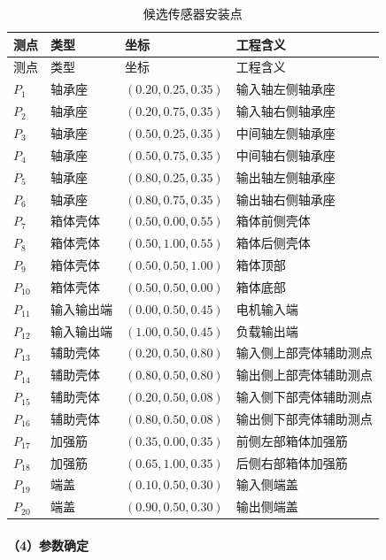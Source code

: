\documentclass[UTF8,a4paper,12pt]{ctexart}
\numberwithin{figure}{section}
\numberwithin{table}{section}
\begin{document}
\begin{longtable}{>{\centering\arraybackslash}p{1.3cm}p{2.6cm}>{\centering\arraybackslash}p{3.1cm}p{5.6cm}}
\caption{候选传感器安装点}\\
\toprule
测点 & 类型 & 坐标 & 工程含义\\
\midrule
\endfirsthead
\toprule
测点 & 类型 & 坐标 & 工程含义\\
\midrule
\endhead
\bottomrule
\endfoot
\(P_1\) & 轴承座 & \((0.20,0.25,0.35)\) & 输入轴左侧轴承座\\
\(P_2\) & 轴承座 & \((0.20,0.75,0.35)\) & 输入轴右侧轴承座\\
\(P_3\) & 轴承座 & \((0.50,0.25,0.35)\) & 中间轴左侧轴承座\\
\(P_4\) & 轴承座 & \((0.50,0.75,0.35)\) & 中间轴右侧轴承座\\
\(P_5\) & 轴承座 & \((0.80,0.25,0.35)\) & 输出轴左侧轴承座\\
\(P_6\) & 轴承座 & \((0.80,0.75,0.35)\) & 输出轴右侧轴承座\\
\(P_7\) & 箱体壳体 & \((0.50,0.00,0.55)\) & 箱体前侧壳体\\
\(P_8\) & 箱体壳体 & \((0.50,1.00,0.55)\) & 箱体后侧壳体\\
\(P_9\) & 箱体壳体 & \((0.50,0.50,1.00)\) & 箱体顶部\\
\(P_{10}\) & 箱体壳体 & \((0.50,0.50,0.00)\) & 箱体底部\\
\(P_{11}\) & 输入输出端 & \((0.00,0.50,0.45)\) & 电机输入端\\
\(P_{12}\) & 输入输出端 & \((1.00,0.50,0.45)\) & 负载输出端\\
\(P_{13}\) & 辅助壳体 & \((0.20,0.50,0.80)\) & 输入侧上部壳体辅助测点\\
\(P_{14}\) & 辅助壳体 & \((0.80,0.50,0.80)\) & 输出侧上部壳体辅助测点\\
\(P_{15}\) & 辅助壳体 & \((0.20,0.50,0.08)\) & 输入侧下部壳体辅助测点\\
\(P_{16}\) & 辅助壳体 & \((0.80,0.50,0.08)\) & 输出侧下部壳体辅助测点\\
\(P_{17}\) & 加强筋 & \((0.35,0.00,0.35)\) & 前侧左部箱体加强筋\\
\(P_{18}\) & 加强筋 & \((0.65,1.00,0.35)\) & 后侧右部箱体加强筋\\
\(P_{19}\) & 端盖 & \((0.10,0.50,0.30)\) & 输入侧端盖\\
\(P_{20}\) & 端盖 & \((0.90,0.50,0.30)\) & 输出侧端盖\\
\end{longtable}

\paragraph{（4）参数确定}
\end{document}
